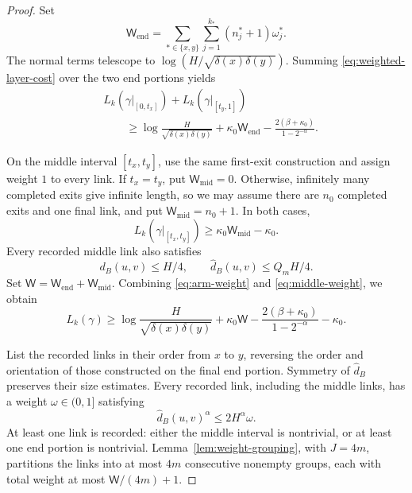 \documentclass[11pt]{article}
\theoremstyle{definition}
\begin{document}
\begin{proof}
Set
\[
\mathsf W_{\mathrm{end}}
=\sum_{\ast\in\{x,y\}}\sum_{j=1}^{k_\ast}
(n_j^\ast+1)\omega_j^\ast.
\]
The normal terms telescope to
\(\log(H/\sqrt{\delta(x)\delta(y)})\). Summing
\eqref{eq:weighted-layer-cost} over the two end portions yields
\begin{equation}\label{eq:arm-weight}
\begin{aligned}
&L_k(\gamma|_{[0,t_x]})+L_k(\gamma|_{[t_y,1]})\\
&\qquad\ge
\log\frac{H}{\sqrt{\delta(x)\delta(y)}}
+\kappa_0\mathsf W_{\mathrm{end}}
-\frac{2(\beta+\kappa_0)}{1-2^{-\alpha}}.
\end{aligned}
\end{equation}

On the middle interval \([t_x,t_y]\), use the same first-exit
construction and assign weight \(1\) to every link. If \(t_x=t_y\),
put \(\mathsf W_{\mathrm{mid}}=0\). Otherwise, infinitely many
completed exits give infinite length, so we may assume there are
\(n_0\) completed exits and one final link, and put
\(\mathsf W_{\mathrm{mid}}=n_0+1\). In both cases,
\begin{equation}\label{eq:middle-weight}
L_k(\gamma|_{[t_x,t_y]})
\ge\kappa_0\mathsf W_{\mathrm{mid}}-\kappa_0.
\end{equation}
Every recorded middle link also satisfies
\begin{equation}\label{eq:mid}
d_B(u,v)\le H/4,\qquad
\widehat d_B(u,v)\le Q_mH/4.
\end{equation}
Set \(\mathsf W=\mathsf W_{\mathrm{end}}+\mathsf W_{\mathrm{mid}}\).
Combining \eqref{eq:arm-weight} and \eqref{eq:middle-weight}, we obtain
\begin{equation}\label{eq:length-versus-weight}
L_k(\gamma)\ge
\log\frac{H}{\sqrt{\delta(x)\delta(y)}}
+\kappa_0\mathsf W
-\frac{2(\beta+\kappa_0)}{1-2^{-\alpha}}-\kappa_0.
\end{equation}

List the recorded links in their order from \(x\) to \(y\), reversing
the order and orientation of those constructed on the final end
portion. Symmetry of \(\widehat d_B\) preserves their size estimates.
Every recorded link, including the middle links, has a weight
\(\omega\in(0,1]\) satisfying
\begin{equation}\label{eq:weighted-link-size}
\widehat d_B(u,v)^\alpha\le2H^\alpha\omega.
\end{equation}
At least one link is recorded: either the middle interval is
nontrivial, or at least one end portion is nontrivial.
Lemma~\ref{lem:weight-grouping}, with \(J=4m\), partitions the links
into at most \(4m\) consecutive nonempty groups, each with total
weight at most \(\mathsf W/(4m)+1\).


\end{proof}
\end{document}
